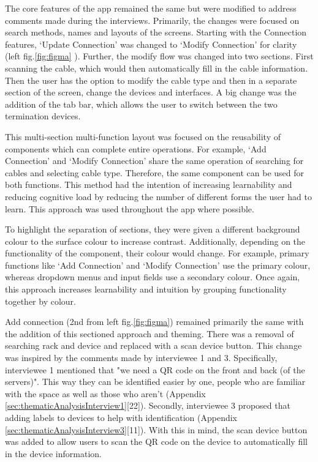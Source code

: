 \documentclass [11pt,a4paper]{article}
\begin{document}
The core features of the app remained the same but were modified to address comments made during the interviews. Primarily, the changes were focused on search methods, names and layouts of the screens. Starting with the Connection features, `Update Connection' was changed to `Modify Connection' for clarity (left fig.\ref{fig:figma} ). Further, the modify flow was changed into two sections. First scanning the cable, which would then automatically fill in the cable information. Then the user has the option to modify the cable type and then in a separate section of the screen, change the devices and interfaces. A big change was the addition of the tab bar, which allows the user to switch between the two termination devices. 

This multi-section multi-function layout was focused on the reusability of components which can complete entire operations. For example, `Add Connection' and `Modify Connection' share the same operation of searching for cables and selecting cable type. Therefore, the same component can be used for both functions. This method had the intention of increasing learnability and reducing cognitive load by reducing the number of different forms the user had to learn. This approach was used throughout the app where possible. 

To highlight the separation of sections, they were given a different background colour to the surface colour to increase contrast. Additionally, depending on the functionality of the component, their colour would change. For example, primary functions like `Add Connection' and `Modify Connection' use the primary colour, whereas dropdown menus and input fields use a secondary colour. Once again, this approach increases learnability and intuition by grouping functionality together by colour.

Add connection (2nd from left fig.\ref{fig:figma}) remained primarily the same with the addition of this sectioned approach and theming. There was a removal of searching rack and device and replaced with a scan device button. This change was inspired by the comments made by interviewee 1 and 3. Specifically, interviewee 1 mentioned that "we need a QR code on the front and back (of the servers)". This way they can be identified easier by one, people who are familiar with the space as well as those who aren't (Appendix \ref{sec:thematicAnalysisInterview1}[22]). Secondly, interviewee 3 proposed that adding labels to devices to help with identification (Appendix \ref{sec:thematicAnalysisInterview3}[11]). With this in mind, the scan device button was added to allow users to scan the QR code on the device to automatically fill in the device information.
\end{document}
